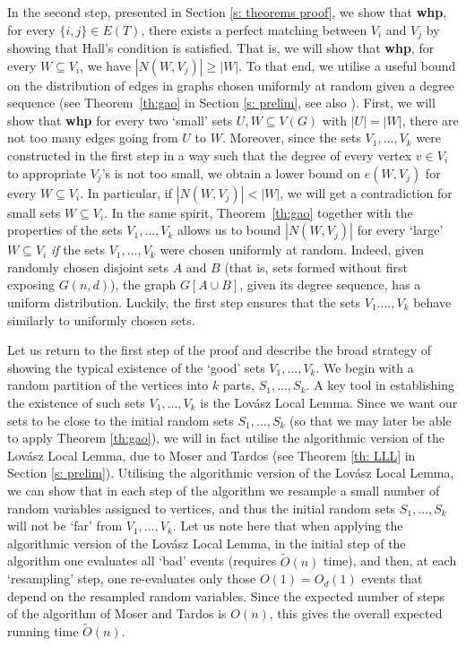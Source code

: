\documentclass[notitlepage]{scrartcl}
\begin{document}
In the second step, presented in Section \ref{s: theorems proof}, we show that \textbf{whp}, for every $\{i,j\}\in E(T)$, there exists a perfect matching between $V_i$ and $V_j$ by showing that Hall's condition is satisfied. That is, we will show that \textbf{whp}, for every $W \subseteq V_i$, we have $|N(W, V_j)| \ge |W|$. To that end, we utilise a useful bound on the distribution of edges in graphs chosen uniformly at random given a degree sequence (see Theorem~\ref{th:gao} in Section \ref{s: prelim}, see also \cite{McKaySurvey}). First, we will show that \textbf{whp} for every two `small' sets $U,W\subseteq V(G)$ with $|U|=|W|$, there are not too many edges going from $U$ to $W$. Moreover, since the sets $V_1,\ldots, V_k$ were constructed in the first step in a way such that the degree of every vertex $v \in V_i$ to appropriate $V_j$'s is not too small, we obtain a lower bound on $e(W, V_j)$ for every $W \subseteq V_i$. In particular, if $|N(W, V_j)| < |W|$, we will get a contradiction for small sets $W\subseteq V_i$. In the same spirit, Theorem~\ref{th:gao} together with the properties of the sets $V_1,\ldots, V_k$ allows us to bound $|N(W, V_j)|$ for every `large' $W \subseteq V_i$ \textit{if} the sets $V_1, \dots, V_k$ were chosen uniformly at random. Indeed, given randomly chosen disjoint sets $A$ and $B$ (that is, sets formed without first exposing $G(n,d)$), the graph $G[A\cup B]$, given its degree sequence, has a uniform distribution. Luckily, the first step ensures that the sets $V_1.\ldots, V_k$ behave similarly to uniformly chosen sets.

Let us return to the first step of the proof and describe the broad strategy of showing the typical existence of the `good' sets $V_1, \dots, V_k$. We begin with a random partition of the vertices into $k$ parts, $S_1,\ldots, S_k$. A key tool in establishing the existence of such sets $V_1, \ldots, V_k$ is the Lov\'asz Local Lemma. Since we want our sets to be close to the initial random sets $S_1,\ldots, S_k$ (so that we may later be able to apply Theorem \ref{th:gao}), we will in fact utilise the algorithmic version of the Lov\'asz Local Lemma, due to Moser and Tardos (see Theorem \ref{th: LLL} in Section \ref{s: prelim}). Utilising the algorithmic version of the Lov\'asz Local Lemma, we can show that in each step of the algorithm we resample a small number of random variables assigned to vertices, and thus the initial random sets $S_1, \dots, S_k$ will not be `far' from $V_1,\ldots, V_k$. Let us note here that when applying the algorithmic version of the Lov\'asz Local Lemma, in the initial step of the algorithm one evaluates all `bad' events (requires $\tilde O(n)$ time), and then, at each `resampling' step, one re-evaluates only those $O(1)=O_d(1)$ events that depend on the resampled random variables. Since the expected number of steps of the algorithm of Moser and Tardos is $O(n)$, this gives the overall expected running time $\tilde{O}(n)$.
\end{document}
